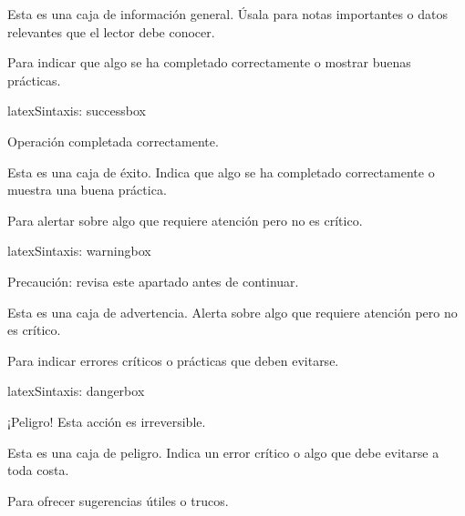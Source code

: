 \begin{infobox}
  Esta es una caja de información general. Úsala para notas importantes
  o datos relevantes que el lector debe conocer.
\end{infobox}

Para indicar que algo se ha completado correctamente o mostrar buenas prácticas.

\begin{codigosimple}{latex}{Sintaxis: successbox}
\begin{successbox}
  Operación completada correctamente.
\end{successbox}
\end{codigosimple}

\begin{successbox}
  Esta es una caja de éxito. Indica que algo se ha completado correctamente
  o muestra una buena práctica.
\end{successbox}

Para alertar sobre algo que requiere atención pero no es crítico.

\begin{codigosimple}{latex}{Sintaxis: warningbox}
\begin{warningbox}
  Precaución: revisa este apartado antes de continuar.
\end{warningbox}
\end{codigosimple}

\begin{warningbox}
  Esta es una caja de advertencia. Alerta sobre algo que requiere atención
  pero no es crítico.
\end{warningbox}

Para indicar errores críticos o prácticas que deben evitarse.

\begin{codigosimple}{latex}{Sintaxis: dangerbox}
\begin{dangerbox}
  ¡Peligro! Esta acción es irreversible.
\end{dangerbox}
\end{codigosimple}

\begin{dangerbox}
  Esta es una caja de peligro. Indica un error crítico o algo que debe
  evitarse a toda costa.
\end{dangerbox}

Para ofrecer sugerencias útiles o trucos.

